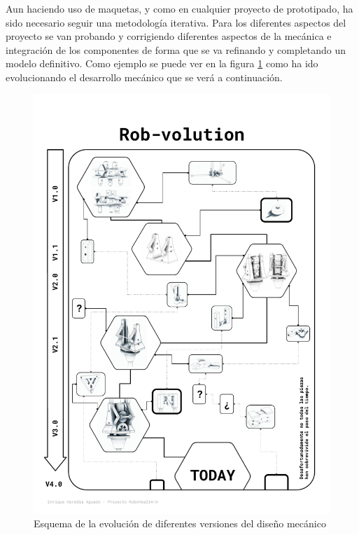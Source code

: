 Aun haciendo uso de maquetas, y como en cualquier proyecto de prototipado, ha sido necesario seguir una metodología iterativa. Para los diferentes aspectos del proyecto se van probando y corrigiendo diferentes aspectos de la mecánica e integración de los componentes de forma que se va refinando y completando un modelo definitivo. Como ejemplo se puede ver en la figura \ref{fig:PuntoPartida:rovbolution} como ha ido evolucionando el desarrollo mecánico que se verá a continuación.
\\


\begin{figure}[H]
    \vspace{-1cm}
    \begin{adjustwidth}{-1.9cm}{-1.5cm}
       \centering
       \includegraphics[width=1.1\textwidth]{figuras/Imagenes_PuntoPartida/Rob-volution.pdf}
       \caption{Esquema de la evolución de diferentes versiones del diseño mecánico}
       \label{fig:PuntoPartida:rovbolution}
   \end{adjustwidth}
\end{figure}

